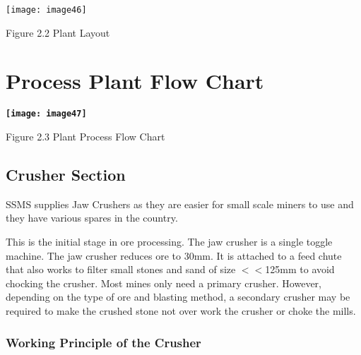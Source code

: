 \noindent \texttt{[image: image46]}

\noindent Figure 2.2 Plant Layout


\section{ Process Plant Flow Chart}

\noindent \textbf{\texttt{[image: image47]}}

\noindent Figure 2.3 Plant Process Flow Chart


\subsection{ Crusher Section}

\noindent SSMS supplies Jaw Crushers as they are easier for small scale miners to use and they have various spares in the country. \par

\noindent This is the initial stage in ore processing. The jaw crusher is a single toggle machine. The jaw crusher reduces ore to 30mm. It is attached to a feed chute that also works to filter small stones and sand of size $<<$125mm to avoid chocking the crusher. Most mines only need a primary crusher. However, depending on the type of ore and blasting method, a secondary crusher may be required to make the crushed stone not over work the crusher or choke the mills. \par


\subsubsection{ Working Principle of the Crusher}

